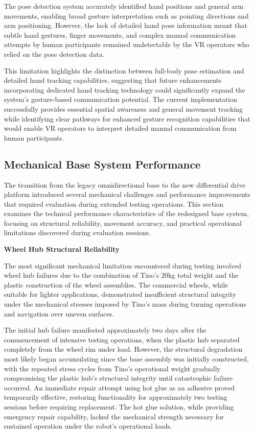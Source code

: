 The pose detection system accurately identified hand positions and general arm movements, enabling broad gesture interpretation such as pointing directions and arm positioning. However, the lack of detailed hand pose information meant that subtle hand gestures, finger movements, and complex manual communication attempts by human participants remained undetectable by the VR operators who relied on the pose detection data.

This limitation highlights the distinction between full-body pose estimation and detailed hand tracking capabilities, suggesting that future enhancements incorporating dedicated hand tracking technology could significantly expand the system's gesture-based communication potential. The current implementation successfully provides essential spatial awareness and general movement tracking while identifying clear pathways for enhanced gesture recognition capabilities that would enable VR operators to interpret detailed manual communication from human participants.

\subsection{Mechanical Base System Performance}

The transition from the legacy omnidirectional base to the new differential drive platform introduced several mechanical challenges and performance improvements that required evaluation during extended testing operations. This section examines the technical performance characteristics of the redesigned base system, focusing on structural reliability, movement accuracy, and practical operational limitations discovered during evaluation sessions.

\textbf{Wheel Hub Structural Reliability}

The most significant mechanical limitation encountered during testing involved wheel hub failures due to the combination of Tino's 20kg total weight and the plastic construction of the wheel assemblies. The commercial wheels, while suitable for lighter applications, demonstrated insufficient structural integrity under the mechanical stresses imposed by Tino's mass during turning operations and navigation over uneven surfaces.

The initial hub failure manifested approximately two days after the commencement of intensive testing operations, when the plastic hub separated completely from the wheel rim under load. However, the structural degradation most likely began accumulating since the base assembly was initially constructed, with the repeated stress cycles from Tino's operational weight gradually compromising the plastic hub's structural integrity until catastrophic failure occurred. An immediate repair attempt using hot glue as an adhesive proved temporarily effective, restoring functionality for approximately two testing sessions before requiring replacement. The hot glue solution, while providing emergency repair capability, lacked the mechanical strength necessary for sustained operation under the robot's operational loads.

